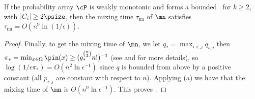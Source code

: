 \begin{theorem}\label{mnMixing} If the %
%
probability array $\cP$ is
weakly monotonic and
%
forms  %
a bounded \kP\, for $k\geq 2$, with $|C_i|\geq 2\psize$, 
then the mixing time $\tau_{\text{nn}}$ of $\mn$ satisfies 
$\tau_{\text{nn}} = O(n^{9}\ln(1/\epsilon))$.
\end{theorem}
\begin{proof}
Finally, to get the mixing time of $\mn$, we let $q_* =
\max_{i<j} q_{i,j}$ then $\pi_* =  \min_{x\in \Omega}\pin(x)
\geq (q_*^{\binom{n}{2}}n!)^{-1}$ (see \cite{bmrs} and \cite{MS} for
more details), so $\log(1/\epsilon \pi_*) = O(n^2\ln \epsilon^{-1})$
since $q$ is bounded from above by a positive constant (all $p_{i,j}$ are constant with respect to $n$).  Applying
(a) we have that the
mixing time of $\mn$ is $O(n^9\ln\epsilon^{-1})$.  This proves
.
\end{proof}
